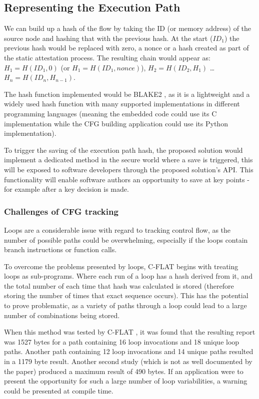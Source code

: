 \subsection{Representing the Execution Path}

We can build up a hash of the flow by taking the ID (or memory address) of the source node and hashing that with the previous hash. At the start ($ID_1$) the previous hash would be replaced with zero, a nonce or a hash created as part of the static attestation process. The resulting chain would appear as: 
$H_1 = H(ID_1,0)$ (or $H_1 = H(ID_1,nonce)$), $H_2 = H(ID_2,H_1)$ \ldots $H_n = H(ID_n,H_{n-1})$.

The hash function implemented would be BLAKE2 \cite{Aumasson2013}, as it is a lightweight and a widely used hash function with many supported implementations in different programming languages (meaning the embedded code could use its C implementation while the CFG building application could use its Python implementation).

To trigger the saving of the execution path hash, the proposed solution would implement a dedicated method in the secure world where a save is triggered, this will be exposed to software developers through the proposed solution's API. This functionality will enable software authors an opportunity to save at key points - for example after a key decision is made.

\subsubsection*{Challenges of CFG tracking}

Loops are a considerable issue with regard to tracking control flow, as the number of possible paths could be overwhelming, especially if the loops contain branch instructions or function calls.

To overcome the problems presented by loops, C-FLAT \cite{Abera2016} begins with treating loops as sub-programs. Where each run of a loop has a hash derived from it, and the total number of each time that hash was calculated is stored (therefore storing the number of times that exact sequence occurs). This has the potential to prove problematic, as a variety of paths through a loop could lead to a large number of combinations being stored. 

When this method was tested by C-FLAT \cite{Abera2016}, it was found that the resulting report was 1527 bytes for a path containing 16 loop invocations and 18 unique loop paths. Another path containing 12 loop invocations and 14 unique paths resulted in a 1179 byte result. Another second study (which is not as well documented by the paper) produced a maximum result of 490 bytes. If an application were to present the opportunity for such a large number of loop variabilities, a warning could be presented at compile time.

